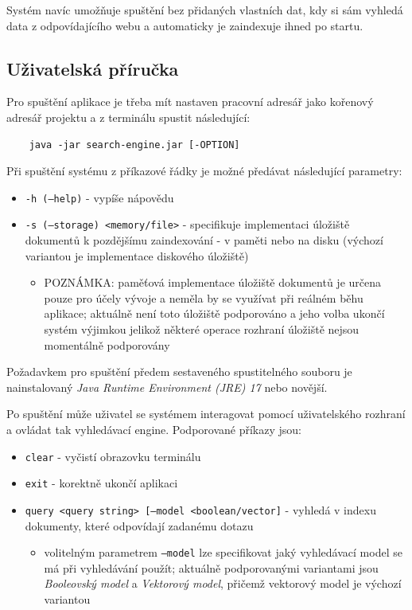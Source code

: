 \documentclass{article}
\begin{document}
Systém navíc umožňuje spuštění bez přidaných vlastních dat, kdy si sám vyhledá data z odpovídajícího webu a automaticky je zaindexuje ihned po startu.

\subsection{Uživatelská příručka}
Pro spuštění aplikace je třeba mít nastaven pracovní adresář jako kořenový adresář projektu a z terminálu spustit následující:

\begin{verbatim}
    java -jar search-engine.jar [-OPTION]
\end{verbatim}

Při spuštění systému z příkazové řádky je možné předávat následující parametry:
\begin{itemize}
    \item \texttt{-h (--help)} - vypíše nápovědu
    \item \texttt{-s (--storage) <memory/file>} - specifikuje implementaci úložiště dokumentů k pozdějšímu zaindexování - v paměti nebo na disku (výchozí variantou je implementace diskového úložiště)
        \begin{itemize}
            \item POZNÁMKA: paměťová implementace úložiště dokumentů je určena pouze pro účely vývoje a neměla by se využívat při reálném běhu aplikace; aktuálně není toto úložiště podporováno a jeho volba ukončí systém výjimkou jelikož některé operace rozhraní úložiště nejsou momentálně podporovány
        \end{itemize}
\end{itemize}

Požadavkem pro spuštění předem sestaveného spustitelného souboru je nainstalovaný \textit{Java Runtime Environment (JRE) 17} nebo novější.

\newpage
Po spuštění může uživatel se systémem interagovat pomocí uživatelského rozhraní a ovládat tak vyhledávací engine. Podporované příkazy jsou:
\begin{itemize}
    \item \texttt{clear} - vyčistí obrazovku terminálu
    \item \texttt{exit} - korektně ukončí aplikaci
    \item \texttt{query <query string> [--model <boolean/vector]} - vyhledá v indexu dokumenty, které odpovídají zadanému dotazu
    \begin{itemize}
        \item volitelným parametrem \texttt{--model} lze specifikovat jaký vyhledávací model se má při vyhledávání použít; aktuálně podporovanými variantami jsou \textit{Booleovský model} a \textit{Vektorový model}, přičemž vektorový model je výchozí variantou
    \end{itemize}
\end{itemize}
\end{document}
